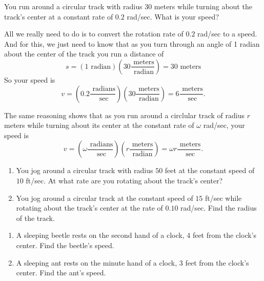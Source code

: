 \documentclass{ximera}
\begin{document}
\begin{question}  \label{Q2675: Angles}
You run around a circular track with radius $30$ meters while turning about the track's center at a constant rate of $0.2$ rad/sec. What is your speed?

\begin{explanation}
All we really need to do is to convert the rotation rate of $0.2$ rad/sec to a speed. And for this, we just need to know that 
as you turn through an angle of 1 radian about the center of the track you run a distance of 
\[
     s = (1 \text{ radian}) \left( 30 \frac{\text{ meters}}{\text{ radian}}\right) = 30 \text{ meters}
\]
So your speed is
\[
   v = \left( 0.2 \frac{\text{ radians}}{\text{ sec}}\right) \left( 30 \frac{\text{ meters}}{\text{ radian}}\right) = 6 \frac{\text{ meters}}{\text{ sec}}.
\]

The same reasoning shows that as you run around a circlular track of radius $r$ meters while turning about its center at the constant rate of $\omega$ rad/sec, your speed is
\[
   v = \left( \omega \frac{\text{ radians}}{\text{ sec}}\right) \left( r \frac{\text{ meters}}{\text{ radian}}\right) = \omega r \frac{\text{ meters}}{\text{ sec}}.
\]


\end{explanation}
\end{question}


\begin{question} \label{Qdft677788877}
\begin{enumerate}

\item You jog around a circular track with radius $50$ feet at the constant speed of $10$ ft/sec. At what rate are you rotating about the track's center?

\item You jog around a circular track at the constant speed of $15$ ft/sec while rotating about the track's center at the rate of $0.10$ rad/sec. Find the radius of the track.


\end{enumerate}
\end{question}

\begin{question}  \label{Q5g4yth4yghy}
\begin{enumerate}

\item A sleeping beetle rests on the second hand of a clock, $4$ feet from the clock's center. Find the beetle's speed.

\item A sleeping ant rests on the minute hand of a clock, $3$ feet from the clock's center. Find the ant's speed.

\end{enumerate}
\end{question}
\end{document}
